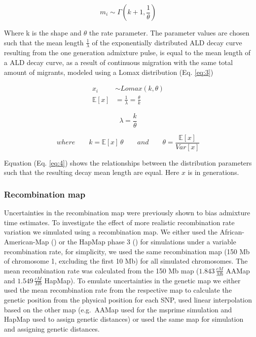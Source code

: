 \documentclass[]{article}
\begin{document}
\begin{equation}
\label{eq:2}
m_i \sim \Gamma(k+1,\frac{1}{\theta})
\end{equation}

Where k is the shape and \(\theta\) the rate parameter. The parameter
values are chosen such that the mean length \(\frac{1}{\lambda}\) of the
exponentially distributed ALD decay curve resulting from the one
generation admixture pulse, is equal to the mean length of a ALD decay
curve, as a result of continuous migration with the same total amount of
migrants, modeled using a Lomax distribution (Eq. \ref{eq:3})

\begin{equation}
\begin{split}
\label{eq:3}
x_i &\sim Lomax(k,\theta) \\
\mathbb{E}[x] &= \frac{1}{\lambda} = \frac{\theta}{k}
\end{split}
\end{equation}

\begin{equation}
\label{eq:4}
\lambda=\frac{k}{\theta}
\end{equation}

\begin{equation*}
\nonumber
where \qquad k=\mathbb{E}[x] \, \theta \qquad and \qquad \theta=\frac{\mathbb{E}[x]}{Var[x]}
\end{equation*}

Equation (Eq. \ref{eq:4}) shows the relationships between the
distribution parameters such that the resulting decay mean length are
equal. Here \(x\) is in generations.

\subsubsection{Recombination map}\label{recombination map}

Uncertainties in the recombination map were previously shown to bias
admixture time estimates. To investigate the effect of more realistic
recombination rate variation we simulated using a recombination map. We
either used the African-American-Map (\cite{hinch_landscape_2011}) or
the HapMap phase 3 (\cite{HapMapConsortium_second_2007}) for simulations
under a variable recombination rate, for simplicity, we used the same
recombination map (150 Mb of chromosome 1, excluding the first 10 Mb)
for all simulated chromosomes. The mean recombination rate was
calculated from the 150 Mb map (\(1.843 \, \frac{cM}{Mb}\) AAMap and
\(1.549 \, \frac{cM}{Mb}\) HapMap). To emulate uncertainties in the
genetic map we either used the mean recombination rate from the
respective map to calculate the genetic position from the physical
position for each SNP, used linear interpolation based on the other map
(e.g.~AAMap used for the msprime simulation and HapMap used to assign
genetic distances) or used the same map for simulation and assigning
genetic distances.
\end{document}
